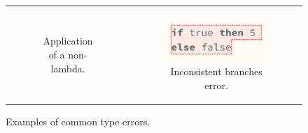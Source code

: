 \begin{figure}[htbp]
\begin{tabular}[b]{cc}
\begin{subfigure}[b]{0.3\columnwidth}
      \caption{Application of a non-lambda.}
      \label{fig:calculus-examples-app-non-lambda}
    \end{subfigure}
    &
    \begin{subfigure}[b]{0.3\columnwidth}
      \includegraphics[width=\columnwidth]{images/haz3l-inconsistent-branches.png}
      \caption{Inconsistent branches error.}
      \label{fig:calculus-examples-inconsistent-branches}
    \end{subfigure}
  \end{tabular}
  \caption{Examples of common type errors.}
  \label{fig:calculus-examples}
\end{figure}
